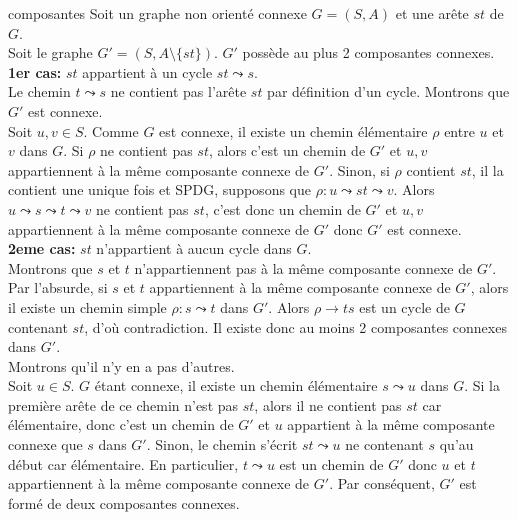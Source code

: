 \documentclass[french, 11pt]{article}
\begin{document}
\begin{lemme}{}{composantes}
    Soit un graphe non orienté connexe $G=(S,A)$ et une arête $st$ de $G$.\\
    Soit le graphe $G'=(S,A\setminus\{st\})$. $G'$ possède au plus 2 composantes connexes.
    \tcblower
    \textbf{1er cas:} $st$ appartient à un cycle $st\leadsto s$.\\
    Le chemin $t\leadsto s$ ne contient pas l'arête $st$ par définition d'un cycle. Montrons que $G'$ est connexe.\\
    Soit $u,v\in S$. Comme $G$ est connexe, il existe un chemin élémentaire $\rho$ entre $u$ et $v$ dans $G$. Si $\rho$ ne contient pas $st$, alors c'est un chemin de $G'$ et $u,v$ appartiennent à la même composante connexe de $G'$. Sinon, si $\rho$ contient $st$, il la contient une unique fois et SPDG, supposons que $\rho:u\leadsto st \leadsto v$. Alors $u\leadsto s \leadsto t \leadsto v$ ne contient pas $st$, c'est donc un chemin de $G'$ et $u,v$ appartiennent à la même composante connexe de $G'$ donc $G'$ est connexe.\\
    \textbf{2eme cas:} $st$ n'appartient à aucun cycle dans $G$.\\
    Montrons que $s$ et $t$ n'appartiennent pas à la même composante connexe de $G'$.\\
    Par l'absurde, si $s$ et $t$ appartiennent à la même composante connexe de $G'$, alors il existe un chemin simple $\rho:s\leadsto t$ dans $G'$. Alors $\rho\to ts$ est un cycle de $G$ contenant $st$, d'où contradiction. Il existe donc au moins 2 composantes connexes dans $G'$.\\
    Montrons qu'il n'y en a pas d'autres.\\
    Soit $u\in S$. $G$ étant connexe, il existe un chemin élémentaire $s\leadsto u$ dans $G$. Si la première arête de ce chemin n'est pas $st$, alors il ne contient pas $st$ car élémentaire, donc c'est un chemin de $G'$ et $u$ appartient à la même composante connexe que $s$ dans $G'$. Sinon, le chemin s'écrit $st\leadsto u$ ne contenant $s$ qu'au début car élémentaire. En particulier, $t\leadsto u$ est un chemin de $G'$ donc $u$ et $t$ appartiennent à la même composante connexe de $G'$. Par conséquent, $G'$ est formé de deux composantes connexes. 
\end{lemme}
\end{document}
